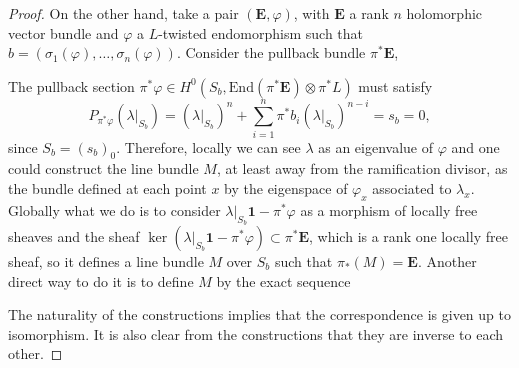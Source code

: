 \documentclass[12pt,a4paper]{book}
\theoremstyle{definition} \newtheorem{defn}[thm]{Definition}
\theoremstyle{definition} \newtheorem{ejemplo}[thm]{Example}
\theoremstyle{remark} \newtheorem{rem}[thm]{Remark}
\def\id{\mathbf{1}}
\def\End{\mathrm{End}}
\newcommand{\ve}[1]{\mathbf{#1}}
\begin{document}
\begin{proof}
	  On the other hand, take a pair $(\ve{E},\varphi)$, with $\ve{E}$ a rank $n$ holomorphic vector bundle and $\varphi$ a $L$-twisted endomorphism such that $b=(\sigma_1(\varphi),\dots,\sigma_n(\varphi))$. Consider the pullback bundle $\pi^*\ve{E}$,
	  \begin{center}
	   \end{center}
	   The pullback section $\pi^*\varphi\in H^0(S_b,\End (\pi^*\ve{E})\otimes \pi^*L)$ must satisfy
	   \begin{equation*}
	     P_{\pi^*\varphi}(\lambda|_{S_b})=(\lambda|_{S_b})^n+ \sum_{i=1}^n \pi^*b_i (\lambda|_{S_b})^{n-i} = s_b=0,
	   \end{equation*}
	   since $S_b=(s_b)_0$. Therefore, locally we can see $\lambda$ as an eigenvalue of $\varphi$ and one could construct the line bundle $M$, at least away from the ramification divisor, as the bundle defined at each point $x$ by the eigenspace of $\varphi_x$ associated to $\lambda_x$. Globally what we do is to consider $\lambda|_{S_b}\id - \pi^*\varphi$ as a morphism of locally free sheaves and the sheaf $\ker(\lambda|_{S_b}\id - \pi^*\varphi) \subset \pi^*\ve{E}$, which is a rank one locally free sheaf, so it defines a line bundle $M$ over $S_b$ such that $\pi_*(M)=\ve{E}$. Another direct way to do it is to define $M$ by the exact sequence
	   \begin{center}
	   \end{center}
	   
	   The naturality of the constructions implies that the correspondence is given up to isomorphism. It is also clear from the constructions that they are inverse to each other.
	\end{proof}
\end{document}
